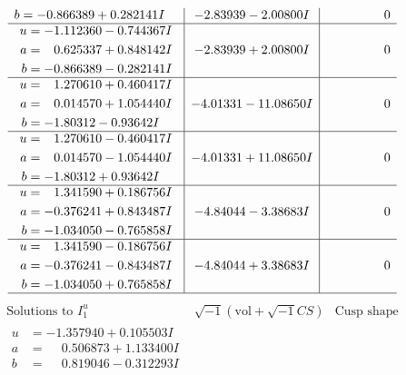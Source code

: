 \documentclass[1p]{elsarticle_modified}
\theoremstyle{definition}
\newcommand{\I}{\sqrt{-1}}
\begin{document}
$$\begin{array}{c|c|c}
\begin{aligned}
b &= -0.866389 + 0.282141 I\end{aligned}
 & -2.83939 - 2.00800 I & \phantom{-0.000000 } 0 \\ \hline\begin{aligned}
u &= -1.112360 - 0.744367 I \\
a &= \phantom{-}0.625337 + 0.848142 I \\
b &= -0.866389 - 0.282141 I\end{aligned}
 & -2.83939 + 2.00800 I & \phantom{-0.000000 } 0 \\ \hline\begin{aligned}
u &= \phantom{-}1.270610 + 0.460417 I \\
a &= \phantom{-}0.014570 + 1.054440 I \\
b &= -1.80312 - 0.93642 I\end{aligned}
 & -4.01331 - 11.08650 I & \phantom{-0.000000 } 0 \\ \hline\begin{aligned}
u &= \phantom{-}1.270610 - 0.460417 I \\
a &= \phantom{-}0.014570 - 1.054440 I \\
b &= -1.80312 + 0.93642 I\end{aligned}
 & -4.01331 + 11.08650 I & \phantom{-0.000000 } 0 \\ \hline\begin{aligned}
u &= \phantom{-}1.341590 + 0.186756 I \\
a &= -0.376241 + 0.843487 I \\
b &= -1.034050 - 0.765858 I\end{aligned}
 & -4.84044 - 3.38683 I & \phantom{-0.000000 } 0 \\ \hline\begin{aligned}
u &= \phantom{-}1.341590 - 0.186756 I \\
a &= -0.376241 - 0.843487 I \\
b &= -1.034050 + 0.765858 I\end{aligned}
 & -4.84044 + 3.38683 I & \phantom{-0.000000 } 0\\
 \hline 
 \end{array}$$\newpage$$\begin{array}{c|c|c}  
\text{Solutions to }I^u_{1}& \I (\text{vol} + \sqrt{-1}CS) & \text{Cusp shape}\\
 \hline 
\begin{aligned}
u &= -1.357940 + 0.105503 I \\
a &= \phantom{-}0.506873 + 1.133400 I \\
b &= \phantom{-}0.819046 - 0.312293 I\end{aligned}

\end{array}$$
\end{document}
